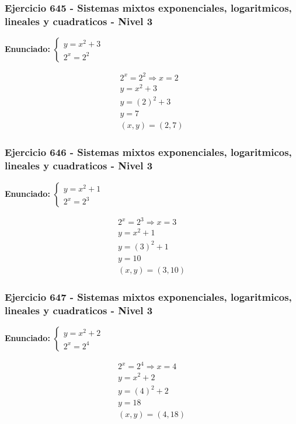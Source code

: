 \documentclass[12pt,a4paper]{article}
\begin{document}
\subsubsection*{Ejercicio 645 - Sistemas mixtos exponenciales, logaritmicos, lineales y cuadraticos - Nivel 3}
\textbf{Enunciado:} \(\begin{cases} y=x^2+3\\ 2^x=2^{2}\end{cases}\)

\[
\begin{aligned}
2^x=2^{2}\Rightarrow x=2\\
y=x^2+3\\
y=(2)^2+3\\
y=7\\
\boxed{(x,y)=(2,7)}
\end{aligned}
\]


\subsubsection*{Ejercicio 646 - Sistemas mixtos exponenciales, logaritmicos, lineales y cuadraticos - Nivel 3}
\textbf{Enunciado:} \(\begin{cases} y=x^2+1\\ 2^x=2^{3}\end{cases}\)

\[
\begin{aligned}
2^x=2^{3}\Rightarrow x=3\\
y=x^2+1\\
y=(3)^2+1\\
y=10\\
\boxed{(x,y)=(3,10)}
\end{aligned}
\]


\subsubsection*{Ejercicio 647 - Sistemas mixtos exponenciales, logaritmicos, lineales y cuadraticos - Nivel 3}
\textbf{Enunciado:} \(\begin{cases} y=x^2+2\\ 2^x=2^{4}\end{cases}\)

\[
\begin{aligned}
2^x=2^{4}\Rightarrow x=4\\
y=x^2+2\\
y=(4)^2+2\\
y=18\\
\boxed{(x,y)=(4,18)}
\end{aligned}
\]
\end{document}
